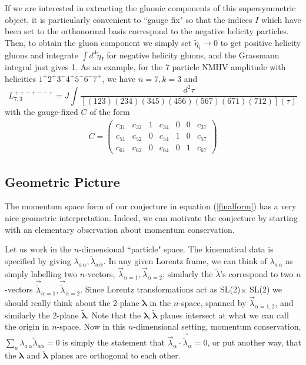 \documentclass[12pt]{article}
\newcommand{\be}{\begin{eqnarray}}
\newcommand{\ee}{\end{eqnarray}}
\begin{document}
If we are interested in extracting the gluonic components of this
supersymmetric object, it is particularly convenient to ``gauge fix"
so that the indices $I$ which have been set  to the orthonormal
basis correspond to the negative helicity particles. Then, to obtain the
gluon component we simply set $\tilde \eta_i \to 0$ to get positive
helicity gluons and integrate $\int d^4 \tilde \eta_I$ for
negative helicity gluons, and the Grassmann integral just gives
1. As an example, for the 7 particle NMHV amplitude with 
helicities $1^+ 2^+ 3^- 4^+ 5^- 6^- 7^+$, we have $n=7,k=3$ and
\begin{equation}
L^{++-+--+}_{7;3} = J \int \frac{d^2 \tau}{[(123)(234)(345)(456)(567)(671)(712)](\tau)}
\end{equation}
with the gauge-fixed $C$ of the form
\be
C = \left(\begin{array}{ccccccc} c_{31}& c_{32} & 1 & c_{34} & 0 & 0 & c_{37} \\ c_{51} & c_{52} & 0 & c_{54} & 1 & 0 & c_{57} \\ c_{61} & c_{62} & 0 & c_{64} &
0 & 1 & c_{67} \end{array} \right)
\ee


\subsection{Geometric Picture}
\label{subsec:GeoPic}

The momentum space form of our conjecture in equation (\ref{finalform}) has a very nice geometric interpretation.  Indeed, we can motivate the conjecture by starting with an elementary observation about momentum conservation.
 
Let us work in the $n$-dimensional ``particle" space. The kinematical data is specified by giving $\lambda_{a \, \alpha}, \tilde \lambda_{a \, \dot{\alpha}}$. In any given Lorentz frame, we can think of $\lambda_{a \, \alpha}$ as simply labelling two $n$-vectors, $\vec{\lambda}_{\alpha=1}, \vec{\lambda}_{\alpha=2}$; similarly the $\tilde \lambda$'s correspond to two $n$-vectors $
\vec{\tilde \lambda}_{\dot{\alpha} =1}, \vec{\tilde \lambda}_{\dot{\alpha}=2}$. Since Lorentz transformations act as SL(2)$\times$ SL(2) we should really think about the 2-plane $\boldsymbol{\lambda}$
in the $n$-space, spanned by $\vec{\lambda}_{\alpha=1,2}$, and similarly the 2-plane $\boldsymbol{\tilde \lambda}$. Note that the $\boldsymbol{\lambda}, \boldsymbol{\tilde \lambda}$ planes intersect at what we can call the origin in $n$-space.
Now in this $n$-dimensional setting, momentum conservation, $\sum_a \lambda_{a \, \alpha} \tilde \lambda_{a \dot{\alpha}}= 0$ is simply the statement that $\vec{\lambda}_\alpha \cdot \vec{\tilde \lambda}_{\dot{\alpha}} = 0$, or put another way, that the $\boldsymbol{\lambda}$ and $\boldsymbol{\tilde \lambda}$ planes are orthogonal to each other.
\end{document}
